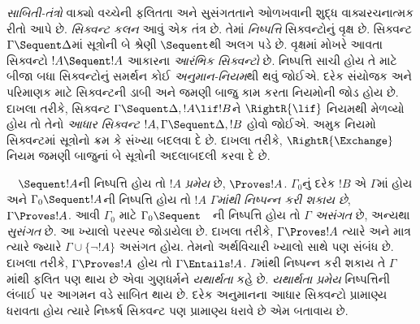 \emph{સાબિતી-તંત્રો} વાક્યો વચ્ચેની ફલિતતા અને સુસંગતતાને ઓળખવાની શુદ્ધ વાક્યરચનાત્મક રીતો આપે છે. \emph{સિક્વન્ટ કલન} આવું એક તંત્ર છે. તેમાં \emph{નિષ્પત્તિ} સિક્વન્ટોનું વૃક્ષ છે. સિક્વન્ટ $\Gamma\Sequent\Delta$માં સૂત્રોની બે શ્રેણી $\Sequent$થી અલગ પડે છે. વૃક્ષમાં મોખરે આવતા સિક્વન્ટો $!A\Sequent !A$ આકારના \emph{આરંભિક સિક્વન્ટો} છે. નિષ્પત્તિ સાચી હોય તે માટે બીજા બધા સિક્વન્ટોનું સમર્થન કોઈ \emph{અનુમાન-નિયમ}થી થવું જોઈએ. દરેક સંયોજક અને પરિમાણક માટે સિક્વન્ટની ડાબી અને જમણી બાજુ કામ કરતા નિયમોની જોડ હોય છે. દાખલા તરીકે, સિક્વન્ટ $\Gamma\Sequent\Delta,!A\lif !B$ને $\RightR{\lif}$ નિયમથી મેળવ્યો હોય તો તેનો \emph{આધાર સિક્વન્ટ} $!A,\Gamma\Sequent\Delta,!B$ હોવો જોઈએ. અમુક નિયમો સિક્વન્ટમાં સૂત્રોનો ક્રમ કે સંખ્યા બદલવા દે છે. દાખલા તરીકે, $\RightR{\Exchange}$ નિયમ જમણી બાજુનાં બે સૂત્રોની અદલાબદલી કરવા દે છે.

$\quad\Sequent !A$ની નિષ્પત્તિ હોય તો $!A$ \emph{પ્રમેય} છે, $\Proves !A$. $\Gamma_0$નું દરેક $!B$ એ $\Gamma$માં હોય અને $\Gamma_0\Sequent !A$ની નિષ્પત્તિ હોય તો $!A$ \emph{$\Gamma$માંથી નિષ્પન્ન કરી શકાય છે}, $\Gamma\Proves !A$. આવી $\Gamma_0$ માટે $\Gamma_0\Sequent\quad$ની નિષ્પત્તિ હોય તો $\Gamma$ \emph{અસંગત} છે, અન્યથા \emph{સુસંગત} છે. આ ખ્યાલો પરસ્પર જોડાયેલા છે. દાખલા તરીકે, $\Gamma\Proves !A$ ત્યારે અને માત્ર ત્યારે જ્યારે $\Gamma\cup\{\lnot !A\}$ અસંગત હોય. તેમનો અર્થવિચારી ખ્યાલો સાથે પણ સંબંધ છે. દાખલા તરીકે, $\Gamma\Proves !A$ હોય તો $\Gamma\Entails !A$. $\Gamma$માંથી નિષ્પન્ન કરી શકાય તે $\Gamma$માંથી ફલિત પણ થાય છે એવા ગુણધર્મને \emph{યથાર્થતા} કહે છે. \emph{યથાર્થતા પ્રમેય} નિષ્પત્તિની લંબાઈ પર આગમન વડે સાબિત થાય છે. દરેક અનુમાનના આધાર સિક્વન્ટો પ્રામાણ્ય ધરાવતા હોય ત્યારે નિષ્કર્ષ સિક્વન્ટ પણ પ્રામાણ્ય ધરાવે છે એમ બતાવાય છે.

